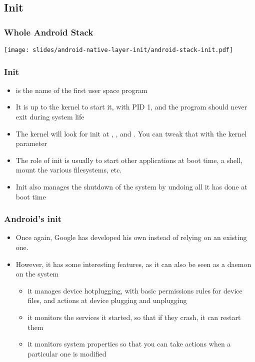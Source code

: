 \subsection{Init}

\begin{frame}
  \frametitle{Whole Android Stack}
  \begin{center}
    \texttt{[image: slides/android-native-layer-init/android-stack-init.pdf]}
  \end{center}
\end{frame}

\begin{frame}
  \frametitle{Init}
  \begin{itemize}
  \item {} is the name of the first user space program
  \item It is up to the kernel to start it, with PID 1, and the
    program should never exit during system life
  \item The kernel will look for init at ,
    ,  and . You can
    tweak that with the  kernel parameter
  \item The role of init is usually to start other applications at
    boot time, a shell, mount the various filesystems, etc.
  \item Init also manages the shutdown of the system by undoing all it
    has done at boot time
  \end{itemize}
\end{frame}

\begin{frame}
  \frametitle{Android's init}
  \begin{itemize}
  \item Once again, Google has developed his own instead of relying on
    an existing one.
  \item However, it has some interesting features, as it can also be
    seen as a daemon on the system
    \begin{itemize}
    \item it manages device hotplugging, with basic
      permissions rules for device files, and actions at device plugging
      and unplugging
    \item it monitors the services it started, so that if they crash,
      it can restart them
    \item it monitors system properties so that you can take
      actions when a particular one is modified
    \end{itemize}
  \end{itemize}
\end{frame}

